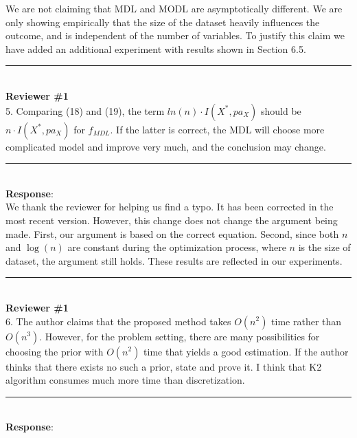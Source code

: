 \documentclass{article}
\begin{document}
We are not claiming that MDL and MODL are asymptotically different.
We are only showing empirically that the size of the dataset heavily influences the outcome, and is independent of the number of variables.
To justify this claim we have added an additional experiment with results shown in Section 6.5.

\noindent\rule{8cm}{0.4pt}\\
{\bf Reviewer \#1} \\

5. Comparing (18) and (19), the term  $ln(n)\cdot I(X^*,pa_X)$ should be $n\cdot I(X^*,pa_X)$ for $f_{MDL}$.  If the latter is correct, the MDL will choose more complicated model and improve very much, and the conclusion may change.

\noindent\rule{8cm}{0.4pt}\\
{\bf Response}:\\

We thank the reviewer for helping us find a typo.
It has been corrected in the most recent version.
However, this change does not change the argument being made.
First, our argument is based on the correct equation.
Second, since both $n$ and $\log(n)$ are constant during the optimization process, where $n$ is the size of dataset, the argument still holds.
These results are reflected in our experiments.

\noindent\rule{8cm}{0.4pt}\\
{\bf Reviewer \#1} \\

6. The author claims that the proposed method takes $O(n^2)$ time rather than $O(n^3)$. However, for the problem setting, there are many possibilities for choosing the prior with $O(n^2)$ time that yields a good estimation. If the author thinks that there exists no such a prior, state and prove it.  I think that K2 algorithm consumes much more time than discretization.

\noindent\rule{8cm}{0.4pt}\\
{\bf Response}:\\


\end{document}
